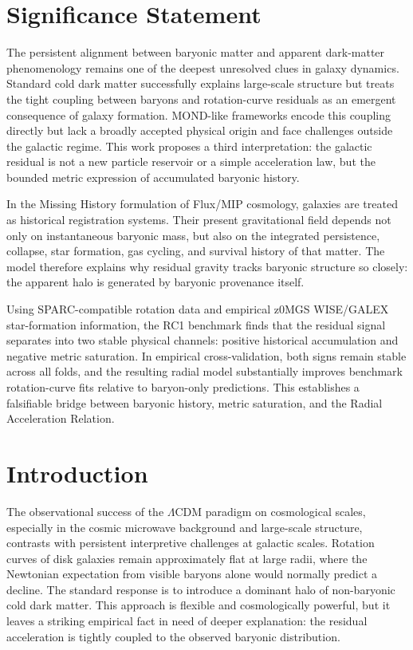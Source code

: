 \documentclass[11pt]{article}
\begin{document}
\section*{Significance Statement}
The persistent alignment between baryonic matter and apparent dark-matter phenomenology remains one of the deepest unresolved clues in galaxy dynamics. Standard cold dark matter successfully explains large-scale structure but treats the tight coupling between baryons and rotation-curve residuals as an emergent consequence of galaxy formation. MOND-like frameworks encode this coupling directly but lack a broadly accepted physical origin and face challenges outside the galactic regime. This work proposes a third interpretation: the galactic residual is not a new particle reservoir or a simple acceleration law, but the bounded metric expression of accumulated baryonic history.

In the Missing History formulation of Flux/MIP cosmology, galaxies are treated as historical registration systems. Their present gravitational field depends not only on instantaneous baryonic mass, but also on the integrated persistence, collapse, star formation, gas cycling, and survival history of that matter. The model therefore explains why residual gravity tracks baryonic structure so closely: the apparent halo is generated by baryonic provenance itself.

Using SPARC-compatible rotation data and empirical z0MGS WISE/GALEX star-formation information, the RC1 benchmark finds that the residual signal separates into two stable physical channels: positive historical accumulation and negative metric saturation. In empirical cross-validation, both signs remain stable across all folds, and the resulting radial model substantially improves benchmark rotation-curve fits relative to baryon-only predictions. This establishes a falsifiable bridge between baryonic history, metric saturation, and the Radial Acceleration Relation.

\section{Introduction}
The observational success of the $\Lambda$CDM paradigm on cosmological scales, especially in the cosmic microwave background and large-scale structure, contrasts with persistent interpretive challenges at galactic scales. Rotation curves of disk galaxies remain approximately flat at large radii, where the Newtonian expectation from visible baryons alone would normally predict a decline. The standard response is to introduce a dominant halo of non-baryonic cold dark matter. This approach is flexible and cosmologically powerful, but it leaves a striking empirical fact in need of deeper explanation: the residual acceleration is tightly coupled to the observed baryonic distribution.
\end{document}

